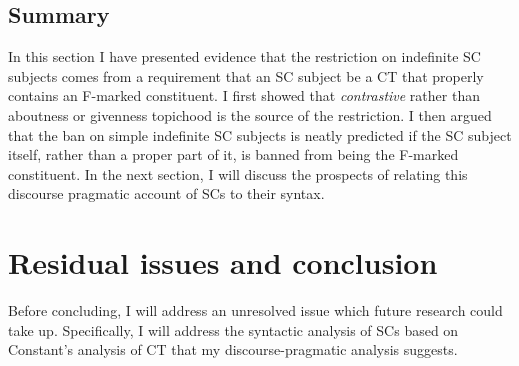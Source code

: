 \documentclass[
]{RCL}
\begin{document}
\subsection{Summary}
In this section I have presented evidence that the restriction on indefinite SC subjects comes from a requirement that an SC subject be a CT that properly contains an F-marked constituent.
I first showed that \textit{contrastive} rather than aboutness or givenness topichood is the source of the restriction.
I then argued that the ban on simple indefinite SC subjects is neatly predicted if the SC subject itself, rather than a proper part of it, is banned from being the F-marked constituent.
In the next section, I will discuss the prospects of relating this discourse pragmatic account of SCs to their syntax.

\section{Residual issues and conclusion}\label{sec:Conclusion}
Before concluding, I will address an unresolved issue which future research could take up.
Specifically, I will address the syntactic analysis of SCs based on Constant's analysis of CT that my discourse-pragmatic analysis suggests.
\end{document}
